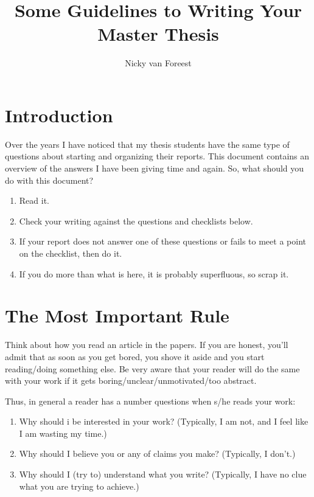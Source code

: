 \documentclass{article}
\title{Some Guidelines to Writing Your Master Thesis}
\author{Nicky van Foreest}
\begin{document}
\maketitle

\section{Introduction}
\label{sec:introduction-1}

Over the years I have noticed that my thesis students have the same
type of questions about starting and organizing their reports. This
document contains an overview of the answers I have been giving time
and again. So, what should you do with this document? 
\begin{enumerate}
\item Read it.
\item Check your writing against the questions and checklists below.
\item If your report does not answer one of these questions or fails
  to meet a point on the checklist, then do it.
\item If you do more than what is here, it is probably superfluous, so
  scrap it.
\end{enumerate}

\section{The Most Important Rule}
\label{sec:most-important-rule}

Think about how you read an article in the papers. If you are honest,
you'll admit that as soon as you get bored, you shove it aside and you
start reading/doing something else. Be very aware that your reader
will do the same with your work if it gets
boring/unclear/unmotivated/too abstract.

Thus, in general a reader has a number questions when s/he reads your
work:
  \begin{enumerate}
  \item Why should i be interested in your work? (Typically, I am not,
    and I feel like I am wasting my time.) \label{item:1}
  \item Why should I believe you or any of claims you make? (Typically, I don't.) \label{item:2}
  \item Why should I (try to) understand what you write?  (Typically,
    I have no clue what you are trying to achieve.) \label{item:3}
  \end{enumerate}
\end{document}
